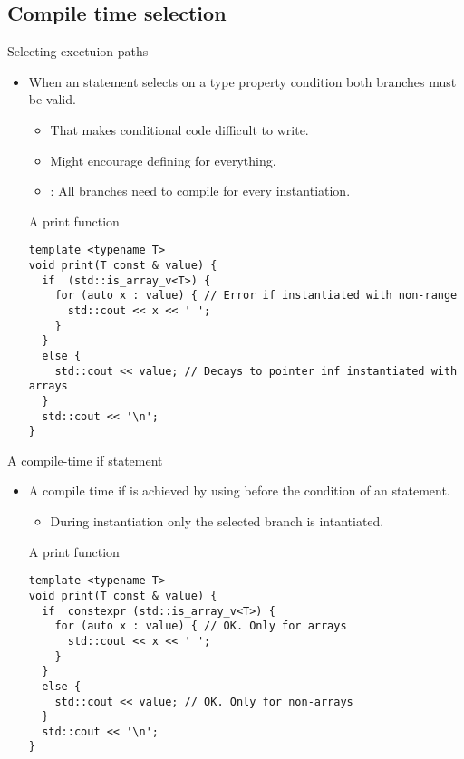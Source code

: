 \subsection{Compile time selection}

\begin{frame}[t,fragile]{Selecting exectuion paths}
\begin{itemize}
  \item When an  statement selects on a type property 
        condition both branches must be valid.
    \begin{itemize}
      \item That makes conditional code difficult to write.
      \item Might encourage defining  for everything.
      \item {}: All branches need to compile for every instantiation.
    \end{itemize}

\begin{block}{A print function}
\begin{lstlisting}[basicstyle=\tiny]
template <typename T>
void print(T const & value) {
  if  (std::is_array_v<T>) {
    for (auto x : value) { // Error if instantiated with non-range
      std::cout << x << ' ';
    }
  }
  else {
    std::cout << value; // Decays to pointer inf instantiated with arrays
  }
  std::cout << '\n';
}
\end{lstlisting}
\end{block}

\end{itemize}
\end{frame}

\begin{frame}[t,fragile]{A compile-time if statement}
\begin{itemize}
  \item A compile time if is achieved by using  before the condition
        of an  statement.
    \begin{itemize}
      \item During instantiation only the selected branch is intantiated.
    \end{itemize}

\begin{block}{A print function}
\begin{lstlisting}[basicstyle=\tiny]
template <typename T>
void print(T const & value) {
  if  constexpr (std::is_array_v<T>) {
    for (auto x : value) { // OK. Only for arrays
      std::cout << x << ' ';
    }
  }
  else {
    std::cout << value; // OK. Only for non-arrays
  }
  std::cout << '\n';
}
\end{lstlisting}
\end{block}

\end{itemize}
\end{frame}
